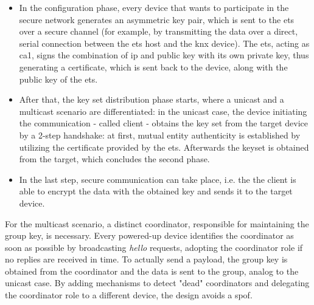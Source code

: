\begin{itemize}
 \item In the configuration phase, every device that wants to participate in the secure network
generates an asymmetric key pair, which is sent to the \gls{ets} over a secure channel (for example, by transmitting the data over a direct, serial connection
between the \gls{ets} host and the \gls{knx} device).
The \gls{ets}, acting as \gls{ca1}, signs the combination of \gls{ip} and public key with its own private key, thus generating a certificate, which is sent back to the device, along
with the public key of the \gls{ets}. 
 \item After that, the key set distribution phase starts, where a unicast and a multicast scenario are differentiated:
in the unicast case, the device initiating the communication - called client - obtains the key set from the target device by a 2-step handshake: at first, mutual entity 
authenticity is established by utilizing the certificate provided by the \gls{ets}. Afterwards the keyset is obtained from the target, which concludes the second
phase.
\item In the last step, secure communication can take place, i.e. the the client is able to
encrypt the data with the obtained key and sends it to the target device.
\end{itemize}
For the multicast scenario, a distinct coordinator, responsible for maintaining the group key, is necessary. Every powered-up device
identifies the coordinator as soon as possible by broadcasting \textit{hello} requests, adopting the coordinator role if no replies are received in time.
To actually send a payload, the group key is obtained from the coordinator and the data is sent to the group, analog to the unicast case.
By adding mechanisms to detect "dead" coordinators and delegating the coordinator role to a different device, the design avoids a \gls{spof}.

